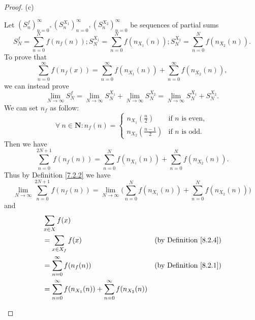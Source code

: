 \begin{proof}{(c)}
\begin{enumerate}[label=(\Roman*)]
\begin{enumerate}[label=(\roman*)]
                        Let \((S_n^f)_{n = 0}^\infty, (S_n^{X_1})_{n = 0}^\infty, (S_n^{X_2})_{n = 0}^\infty\) be sequences of partial sums
                        \[
                            S_N^f = \sum_{n = 0}^N f(n_f(n)) ; S_N^{X_1} = \sum_{n = 0}^N f(n_{X_1}(n)) ; S_N^{X_2} = \sum_{n = 0}^N f(n_{X_2}(n)).
                        \]
                        To prove that
                        \[
                            \sum_{n = 0}^\infty f(n_f(x)) = \sum_{n = 0}^\infty f(n_{X_1}(n)) + \sum_{n = 0}^\infty f(n_{X_2}(n)),
                        \]
                        we can instead prove
                        \[
                            \lim_{N \to \infty} S_N^f = \lim_{N \to \infty} S_N^{X_1} + \lim_{N \to \infty} S_N^{X_2} = \lim_{N \to \infty} S_N^{X_1} + S_N^{X_2}.
                        \]
                        We can set \(n_f\) as follow:
                        \[
                            \forall\ n \in \mathbf{N} : n_f(n) = \begin{cases}
                                n_{X_1}(\frac{n}{2})     & \text{if } n \text{ is even}, \\
                                n_{X_2}(\frac{n - 1}{2}) & \text{if } n \text{ is odd}.
                            \end{cases}
                        \]
                        Then we have
                        \[
                            \sum_{n = 0}^{2N + 1} f(n_f(n)) = \sum_{n = 0}^N f(n_{X_1}(n)) + \sum_{n = 0}^N f(n_{X_2}(n)).
                        \]
                        Thus by Definition \ref{7.2.2} we have
                        \[
                            \lim_{N \to \infty} \sum_{n = 0}^{2N + 1} f(n_f(n)) = \lim_{N \to \infty} \Bigg(\sum_{n = 0}^N f(n_{X_1}(n)) + \sum_{n = 0}^N f(n_{X_2}(n))\Bigg)
                        \]
                        and
                        \begin{align*}
                             & \sum_{x \in X} f(x)                                                                                          \\
                             & = \sum_{x \in X_f} f(x)                                                 & \text{(by Definition \ref{8.2.4})} \\
                             & = \sum_{n = 0}^\infty f(n_f(n))                                         & \text{(by Definition \ref{8.2.1})} \\
                             & = \sum_{n = 0}^\infty f(n_{X_1}(n)) + \sum_{n = 0}^\infty f(n_{X_2}(n))                                      \\

\end{align*}
\end{enumerate}
\end{enumerate}
\end{proof}
